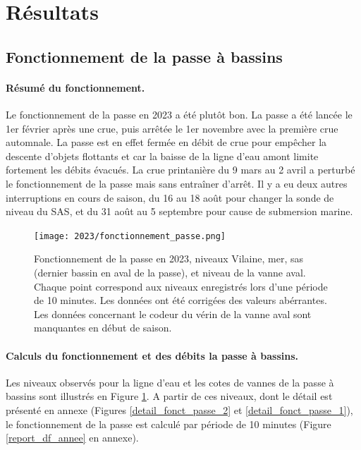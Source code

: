 \documentclass[11pt,twocolumn,titlepage,twoside]{article}\usepackage[]{graphicx}\usepackage[]{color}
\begin{document}
\section{Résultats}
\subsection{Fonctionnement de la passe à bassins}
\paragraph{Résumé du fonctionnement.}

Le fonctionnement de la passe en 2023 a été plutôt bon. 
La passe a été lancée le 1er février après une crue, puis arrêtée 
le 1er novembre avec la première crue automnale. La passe est en 
effet fermée en débit de crue pour empêcher la descente d'objets 
flottants et car la baisse de la ligne d'eau amont limite fortement les débits évacués.
La crue printanière du 9 mars au 2 avril a perturbé le fonctionnement 
de la passe mais sans entraîner d'arrêt. Il y a eu deux autres interruptions en cours de saison, 
du 16 au 18 août pour changer la sonde de niveau du SAS, et du 31 août au 5 septembre 
pour cause de submersion marine.

\begin{figure}[htpb]
\centering
\texttt{[image: 2023/fonctionnement\_passe.png]}
\caption{Fonctionnement de la passe en 2023, niveaux Vilaine, mer, sas
(dernier bassin en aval de la passe), et niveau de la vanne aval. Chaque point correspond aux niveaux
enregistrés lors d'une période de 10 minutes. Les données ont été corrigées des
valeurs abérrantes. Les données concernant le codeur du vérin de la vanne aval
sont manquantes en début de saison.}
\label{figure_fonctionnement_passe}
\end{figure}

\paragraph{Calculs du fonctionnement et des débits la passe à bassins.}
Les niveaux observés pour la ligne d'eau et les cotes de vannes de la passe
à bassins sont illustrés en Figure \ref{figure_fonctionnement_passe}. A
partir de ces niveaux, dont le détail est présenté en annexe (Figures
\ref{detail_fonct_passe_2} et \ref{detail_fonct_passe_1}), le fonctionnement
de la passe est calculé par période de 10 minutes (Figure \ref{report_df_annee}
en annexe).
\end{document}
